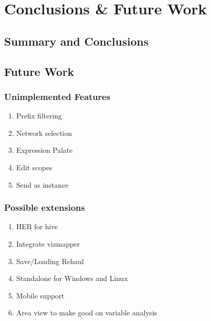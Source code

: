 \chapter{Conclusions \& Future Work}

\section{Summary and Conclusions}

\section{Future Work}
	\subsection{Unimplemented Features}
	\begin{enumerate}
		\item Prefix filtering
		\item Network selection
		\item Expression Palate 
		\item Edit scopes
		\item Send as instance
	\end{enumerate}
	\subsection{Possible extensions} %
	\label{sub:possible_extensions}
	\begin{enumerate}
		\item HEB for hive
		\item Integrate vizmapper
		\item Save/Loading Rehaul
		\item Standalone for Windows and Linux
		\item Mobile support
		\item Area view to make good on variable analysis
	\end{enumerate}
